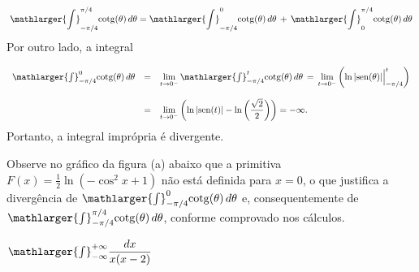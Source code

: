\cleardoublepage\documentclass[../main.tex]{subfiles}
\begin{document}
\begin{ex}
\begin{compactenum}[a)]
\begin{solution}
\[ \mathlarger{\int}^{\pi/4}_{-\pi/4} {\rm cotg}(\theta) \,d\theta= \mathlarger{\int}^{0}_{-\pi/4} {\rm cotg}(\theta) \,d\theta\,+\,\mathlarger{\int}^{\pi/4}_{0} {\rm cotg}(\theta) \,d\theta \]
Por outro lado, a integral

\[ \begin{array}{rcl} \mathlarger{\int}^{0}_{-\pi/4} {\rm cotg}(\theta) \,d\theta&=&\lim\limits_{t \to 0^{-}} \mathlarger{\int}^{t}_{-\pi/4} {\rm cotg}(\theta) \,d\theta\,=\,\lim\limits_{t \to 0^{-}} \left(\ln |{\rm sen}(\theta) | \Big{|}^{t}_{-\pi/4}\right) \\ \\ &=&\lim\limits_{t \to 0^{-}} \left(\ln |{\rm sen}(t) | - \ln\left(\dfrac{\sqrt{2}}{2}\right) \right)=-\infty. \end{array} \]
Portanto, a integral imprópria é divergente.

Observe no gráfico da figura (a) abaixo que a primitiva  $F(x)=\frac{1}{2}\ln\left(-\cos^2 x+1\right)$ não está definida para $x=0$, o que justifica  a divergência de $\mathlarger{\int}^{0}_{-\pi/4} {\rm cotg}(\theta) \,d\theta$ e, consequentemente de $\mathlarger{\int}^{\pi/4}_{-\pi/4} {\rm cotg}(\theta) \,d\theta$, conforme comprovado nos cálculos.
\end{solution}
\begin{figure}[H]
    \centering
    \quad
{}
\end{figure}
\item \(\mathlarger{\int}^{+\infty}_{-\infty} \dfrac{dx}{x(x-2)}\)


\end{compactenum}
\end{ex}
\end{document}
